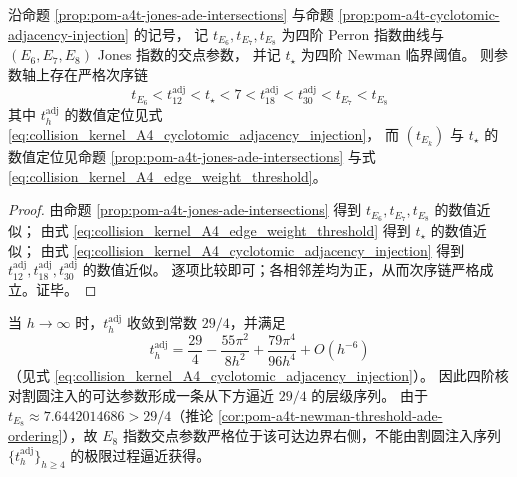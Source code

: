 \begin{corollary}\label{cor:pom-a4t-cyclotomic-adj-ordering-chain}
沿命题 \ref{prop:pom-a4t-jones-ade-intersections} 与命题 \ref{prop:pom-a4t-cyclotomic-adjacency-injection} 的记号，
记 \(t_{E_6},t_{E_7},t_{E_8}\) 为四阶 Perron 指数曲线与 \((E_6,E_7,E_8)\) Jones 指数的交点参数，
并记 \(t_\star\) 为四阶 Newman 临界阈值。
则参数轴上存在严格次序链
\[
\boxed{\;
t_{E_6}
<
t_{12}^{\mathrm{adj}}
<
t_\star
<
7
<
t_{18}^{\mathrm{adj}}
<
t_{30}^{\mathrm{adj}}
<
t_{E_7}
<
t_{E_8}\;}
\]
其中 \(t_h^{\mathrm{adj}}\) 的数值定位见式 \eqref{eq:collision_kernel_A4_cyclotomic_adjacency_injection}，
而 \((t_{E_k})\) 与 \(t_\star\) 的数值定位见命题 \ref{prop:pom-a4t-jones-ade-intersections} 与式 \eqref{eq:collision_kernel_A4_edge_weight_threshold}。
\end{corollary}
\begin{proof}
由命题 \ref{prop:pom-a4t-jones-ade-intersections} 得到 \(t_{E_6},t_{E_7},t_{E_8}\) 的数值近似；
由式 \eqref{eq:collision_kernel_A4_edge_weight_threshold} 得到 \(t_\star\) 的数值近似；
由式 \eqref{eq:collision_kernel_A4_cyclotomic_adjacency_injection} 得到 \(t_{12}^{\mathrm{adj}},t_{18}^{\mathrm{adj}},t_{30}^{\mathrm{adj}}\) 的数值近似。
逐项比较即可；各相邻差均为正，从而次序链严格成立。证毕。
\end{proof}

\begin{remark}\label{rem:pom-a4t-cyclotomic-adj-asymptotic}
当 \(h\to\infty\) 时，\(t_h^{\mathrm{adj}}\) 收敛到常数 \(29/4\)，并满足
\[
t_h^{\mathrm{adj}}
=\frac{29}{4}
-\frac{55\pi^2}{8h^2}
+\frac{79\pi^4}{96h^4}
+O(h^{-6})
\]
（见式 \eqref{eq:collision_kernel_A4_cyclotomic_adjacency_injection}）。
因此四阶核对割圆注入的可达参数形成一条从下方逼近 \(29/4\) 的层级序列。
由于 \(t_{E_8}\approx 7.6442014686>29/4\)（推论 \ref{cor:pom-a4t-newman-threshold-ade-ordering}），故 \(E_8\) 指数交点参数严格位于该可达边界右侧，不能由割圆注入序列 \(\{t_h^{\mathrm{adj}}\}_{h\ge 4}\) 的极限过程逼近获得。
\end{remark}

